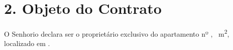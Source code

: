 \section*{2. Objeto do Contrato}
O Senhorio declara ser o proprietário exclusivo do apartamento nº \Propunitnumber, \Propaream~m\textsuperscript{2}, localizado em \Propaddress.
